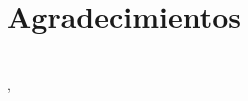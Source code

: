 %
%

\cleardoublepage
{}

\chapter*{Agradecimientos}


\makeatletter		
\begin{flushright}
	\vspace{1,5cm}
	\textit{\@autor}\\
	\@lugarDef, \@yearDef
\end{flushright}
\makeatother